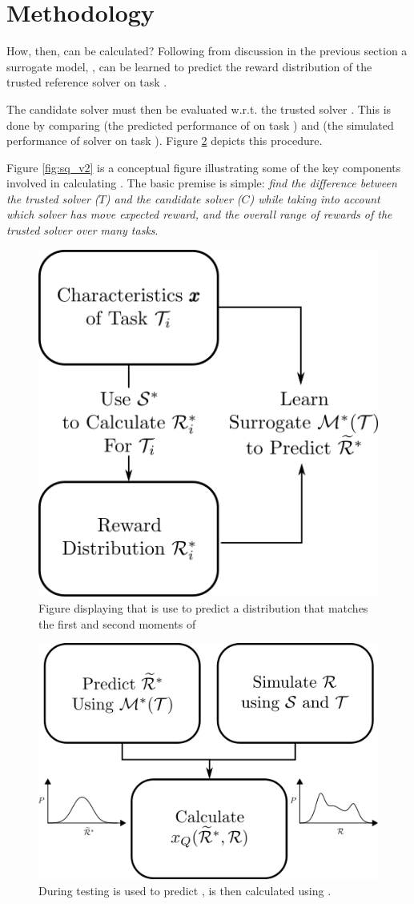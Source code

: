 \section{Methodology}
How, then, can \xQ{} be calculated? Following from discussion in the previous section a surrogate model, \surrogate{}, can be learned to predict the reward distribution \rwdstarapprox{} of the trusted reference solver \solvestar{} on task \task{}.

The candidate solver \solve{} must then be evaluated w.r.t. the trusted solver \solvestar{}. This is done by comparing \rwdstarapprox{} (the predicted performance of \solvestar{} on task \task) and \rwd{} (the simulated performance of solver \solve{} on task \task). Figure \ref{fig:sq_test} depicts this procedure.

Figure \ref{fig:sq_v2} is a conceptual figure illustrating some of the key components involved in calculating \xQ. The basic premise is simple: \emph{find the difference between the trusted solver ($T$) and the candidate solver ($C$) while taking into account which solver has move expected reward, and the overall range of rewards of the trusted solver over many tasks}.

\begin{figure}[tb]
    \centering
    \includegraphics[width=0.55\linewidth]{Figures/SQ_train.png}
    \caption{Figure displaying that \surrogate{} is use to predict a distribution  \rwdstariapprox{} that matches the first and second moments of \rwdstari}
    \label{fig:sq_train}
\end{figure}%

\begin{figure}[tb]
    \centering
    \includegraphics[width=0.6\linewidth]{Figures/SQ_test.png}
    \caption{During testing \surrogate{} is used to predict \rwdstarapprox{}, \xQ{} is then calculated using \rwd{}.}
    \label{fig:sq_test}
\end{figure}

